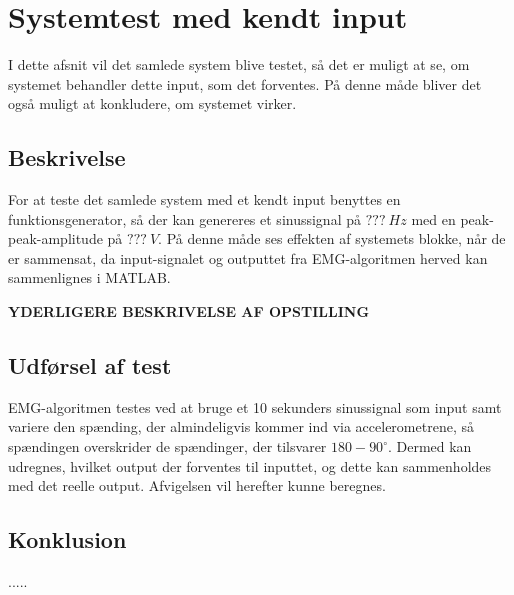 \section{Systemtest med kendt input}
I dette afsnit vil det samlede system blive testet, så det er muligt at se, om systemet behandler dette input, som det forventes. På denne måde bliver det også muligt at konkludere, om systemet virker. 

\subsection{Beskrivelse}
For at teste det samlede system med et kendt input benyttes en funktionsgenerator, så der kan genereres et sinussignal på $???~Hz$ med en peak-peak-amplitude på $???~V$. På denne måde ses effekten af systemets blokke, når de er sammensat, da input-signalet og outputtet fra EMG-algoritmen herved kan sammenlignes i MATLAB.

\textbf{YDERLIGERE BESKRIVELSE AF OPSTILLING}
 
\subsection{Udførsel af test}

EMG-algoritmen testes ved at bruge et 10 sekunders sinussignal som input samt variere den spænding, der almindeligvis kommer ind via accelerometrene, så spændingen overskrider de spændinger, der tilsvarer $180-90^{\circ}$. 
Dermed kan udregnes, hvilket output der forventes til inputtet, og dette kan sammenholdes med det reelle output. Afvigelsen vil herefter kunne beregnes. 

\subsection{Konklusion}
.....